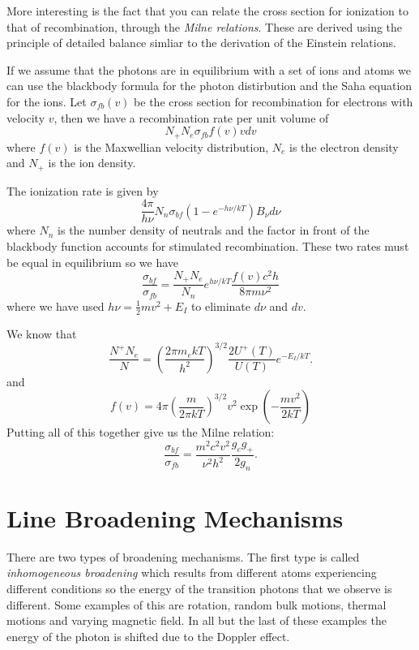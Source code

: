 More interesting is the fact that you can relate the cross section for
ionization to that of recombination, through the {\em Milne
relations}.  These are derived using the principle of detailed balance
simliar to the derivation of the Einstein relations.

If we assume that the photons are in equilibrium with a set of ions
and atoms we can use the blackbody formula for the photon distirbution
and the Saha equation for the ions.  Let $\sigma_{fb}(v)$ be the cross
section for recombination for electrons with velocity $v$, then we
have a recombination rate per unit volume of
\begin{equation}
N_+ N_e \sigma_{fb} f(v) v dv
\label{eq:559}
\end{equation}
where $f(v)$ is the Maxwellian velocity distribution, $N_e$ is the
electron density and $N_+$ is the ion density.

The ionization rate is given by
\begin{equation}
\frac{4\pi}{h\nu} N_n \sigma_{bf} ( 1 - e^{-h\nu/kT} ) B_\nu d\nu
\label{eq:560}
\end{equation}
where $N_n$ is the number density of neutrals and the factor in front
of the blackbody function accounts for stimulated recombination.
These two rates must be equal in equilibrium so we have
\begin{equation}
\frac{\sigma_{bf}}{\sigma_{fb}} = \frac{N_+ N_e}{N_n} e^{h\nu/kT}
\frac{f(v) c^2 h}{8\pi m \nu^2}
\label{eq:561}
\end{equation}
where we have used $h\nu = \frac{1}{2} m v^2 + E_I$ to eliminate
$d\nu$ and $dv$.

We know that
\begin{equation}
\frac{N^+ N_e}{N} = \left ( \frac{2\pi m_e kT}{h^2} \right)^{3/2}
\frac{2 U^+(T)}{U(T)} e^{-E_I/kT}.
\label{eq:562}
\end{equation}
and
\begin{equation}
f(v) = 4\pi \left ( \frac{m}{2\pi k T} \right )^{3/2} v^2 \exp \left
(-\frac{mv^2}{2kT} \right )
\label{eq:563}
\end{equation}
Putting all of this together give us the Milne relation:
\begin{equation}
\frac{\sigma_{bf}}{\sigma_{fb}} = \frac{m^2 c^2 v^2}{\nu^2 h^2}
\frac{g_e g_+}{2 g_n}.
\label{eq:564}
\end{equation}

\section{Line Broadening Mechanisms}
\label{sec:line-broad-mech}
There are two types of broadening mechanisms.  The first type is
called {\em inhomogeneous broadening} which results from different
atoms experiencing different conditions so the energy of the
transition photons that we observe is different.  Some examples of
this are rotation, random bulk motions, thermal motions and 
varying magnetic field.   In all but the last of these examples the
energy of the photon is shifted due to the Doppler effect.

